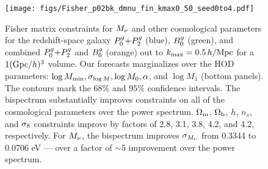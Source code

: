 \begin{figure}
    \begin{center}
        \texttt{[image: figs/Fisher\_p02bk\_dmnu\_fin\_kmax0\_50\_seed0to4.pdf]}
        \caption{Fisher matrix constraints for $M_\nu$ and other cosmological
        parameters for the redshift-space galaxy $P^g_0{+}P^g_2$ (blue), $B^g_0$
        (green), and combined $P^g_0{+}P^g_2$ and $B^g_0$ (orange) out to $k_{\rm max} =
        0.5\,h/\mathrm{Mpc}$ for a $1 ({\rm Gpc}/h)^3$ volume. Our forecasts marginalizes over the \cite{zheng2007}
        HOD parameters: $\log M_{\rm min}, \sigma_{\log M}, \log M_0, \alpha$, 
        and $\log M_1$ (bottom panels). The contours mark the $68\%$ and $95\%$
        confidence intervals. The bispectrum substantially improves
        constraints on all of the cosmological parameters over the power
        spectrum. $\Omega_{\rm m}$, $\Omega_{\rm b}$, $h$, $n_s$, and $\sigma_8$ constraints improve by factors
        of 2.8, 3.1, 3.8, 4.2, and 4.2, respectively. For $M_\nu$, the
        bispectrum improves $\sigma_{M_\nu}$ from 0.3344 to 0.0706 eV --- over
        a factor of ${\sim}5$ improvement over the power spectrum.
        }
        \label{fig:forecast}
    \end{center}
\end{figure}

